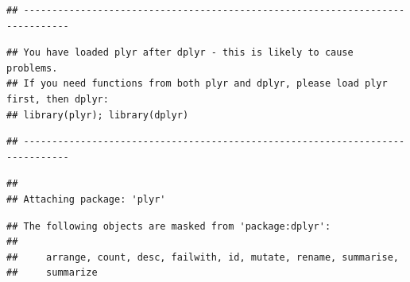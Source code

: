 \documentclass[
]{article}
\begin{document}
\begin{verbatim}
## ------------------------------------------------------------------------------
\end{verbatim}

\begin{verbatim}
## You have loaded plyr after dplyr - this is likely to cause problems.
## If you need functions from both plyr and dplyr, please load plyr first, then dplyr:
## library(plyr); library(dplyr)
\end{verbatim}

\begin{verbatim}
## ------------------------------------------------------------------------------
\end{verbatim}

\begin{verbatim}
## 
## Attaching package: 'plyr'
\end{verbatim}

\begin{verbatim}
## The following objects are masked from 'package:dplyr':
## 
##     arrange, count, desc, failwith, id, mutate, rename, summarise,
##     summarize
\end{verbatim}
\end{document}
